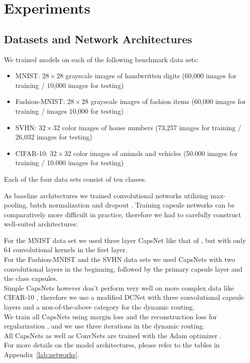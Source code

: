 
\section{Experiments}
\label{sec:experiments}

\subsection{Datasets and Network Architectures}

We trained models on each of the following benchmark data sets:

\begin{itemize}
	\item MNIST: $28\times28$ grayscale images of handwritten digits (60,000  images for training / 10,000  images for testing) \cite{mnist}
	\item Fashion-MNIST:  $28\times28$ grayscale images of fashion items (60,000 images for training / images 10,000 for testing) \cite{fashion}
	\item SVHN: $32\times32$ color images of house numbers (73,257  images for training / 26,032 images for testing) \cite{svhn}
	\item CIFAR-10: $32\times32$ color images of animals and vehicles (50.000  images for training / 10.000  images for testing) \cite{cifar}
\end{itemize}

Each of the four data sets consist of ten classes.

As baseline architectures we trained convolutional networks utilizing max-pooling,
batch normalization \citep{batchnorm} and dropout \citep{dropout}.
Training capsule networks can be comparatively more difficult in practice, therefore we had to carefully construct well-suited architectures:

For the MNIST data set we used three layer CapsNet like that of \citet{capsules}, but with only 64 convolutional kernels in the first layer. \\
For the Fashion-MNIST and the SVHN data sets we used CapsNets with two convolutional layers in the beginning, followed by the primary capsule layer and the class capsules. \\
Simple CapsNets however don't perform very well on more complex data like CIFAR-10 \citep{complex}, therefore we use a modified DCNet \citep{dcnet} with three convolutional capsule layers and a non-of-the-above category for the dynamic routing. \\
We train all CapsNets using margin loss and the reconstruction loss for regularization \citep{capsules}, and we use three iterations in the dynamic routing. \\
All CapsNets as well as ConvNets are trained with the Adam optimizer \citep{adam}. \\
For more details on the model architectures, please refer to the tables in Appendix~\ref{lab:networks}.

